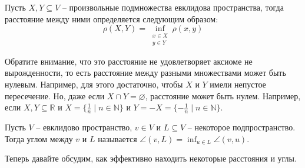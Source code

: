 \begin{definition}
Пусть $X,Y\subseteq V$ -- произвольные подмножества евклидова пространства, тогда расстояние между ними определяется следующим образом:
\[
\rho(X, Y) = \inf_{\substack{x\in X\\y\in Y}}\rho(x, y)
\]
\end{definition}
Обратите внимание, что это расстояние не удовлетворяет аксиоме не вырожденности, то есть расстояние между разными множествами может быть нулевым.
Например, для этого достаточно, чтобы $X$ и $Y$ имели непустое пересечение.
Но, даже если $X\cap Y = \varnothing$, расстояние может быть нулем.
Например, если $X, Y \subseteq \mathbb R$ и $X = \{\frac{1}{n}\mid n\in \mathbb N\}$ и $Y = - X = \{-\frac{1}{n}\mid n\in \mathbb N\}$.

\begin{definition}
Пусть $V$ -- евклидово пространство, $v\in V$ и $L\subseteq V$ -- некоторое подпространство.
Тогда углом между $v$ и $L$ называется $\angle (v, L) = \inf_{u\in L}\angle (v,u)$.
\end{definition}

Теперь давайте обсудим, как эффективно находить некоторые расстояния и углы.

